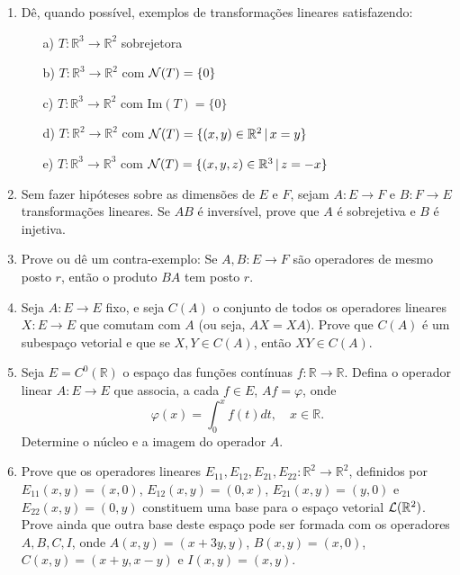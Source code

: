 \documentclass[12pt]{article}
\begin{document}
\begin{enumerate}
\item Dê, quando possível, exemplos de transformações lineares satisfazendo:
\begin{itemize}
\item[a)] $T:{\mathbb{R}}^3\to {\mathbb{R}}^2$ sobrejetora
\item[b)] $T:{\mathbb{R}}^3\to {\mathbb{R}}^2$ com ${\cal{N}}(T) = \{0\}$
\item[c)] $T:{\mathbb{R}}^3\to {\mathbb{R}}^2$ com Im$(T) = \{0\}$
\item[d)] $T:{\mathbb{R}}^2\to {\mathbb{R}}^2$ com ${\cal{N}}(T) = \{ (x,y)\in {\mathbb{R}}^2 \, | \, x=y\}$
\item[e)] $T:{\mathbb{R}}^3\to {\mathbb{R}}^3$ com ${\cal{N}}(T) = \{ (x,y,z) \in {\mathbb{R}}^3 \, | \, z=-x\}$
\end{itemize}
   
\item Sem fazer hipóteses sobre as dimensões de $E$ e $F$, sejam $A:E\rightarrow F$ e $B:F\rightarrow E$ transformações lineares. Se $AB$ é inversível, prove que $A$ é sobrejetiva e $B$ é injetiva.

\item Prove ou dê um contra-exemplo: Se $A,B:E\rightarrow F$ são operadores de mesmo posto $r$, então o produto $BA$ tem posto $r$.

\item Seja $A:E\rightarrow E$ fixo, e seja $C(A)$ o conjunto de todos os operadores lineares $X:E\rightarrow E$ que comutam com $A$ (ou seja, $AX=XA$). Prove que $C(A)$ é um subespaço vetorial e que se $X,Y\in C(A)$, então $XY \in C(A)$.

\item Seja $E=C^0({\mathbb{R}})$ o espaço das funções contínuas $f:{\mathbb{R}}\rightarrow {\mathbb{R}}$. Defina o operador linear $A:E\rightarrow E$ que associa, a cada $f\in E$, $Af=\varphi$, onde 
  $$\varphi (x) = \int_0^x f(t) dt, \quad x\in {\mathbb{R}}.$$
  Determine o núcleo e a imagem do operador $A$.

\item Prove que os operadores lineares $E_{11}, E_{12}, E_{21}, E_{22} : {\mathbb{R}}^2 \rightarrow {\mathbb{R}}^2$, definidos por $E_{11}(x,y) = (x,0)$, $E_{12}(x,y) = (0,x)$, $E_{21}(x,y) = (y,0)$ e $E_{22}(x,y) = (0,y)$ constituem uma base para o espaço vetorial ${\cal{L}}({\mathbb{R}}^2)$. Prove ainda que outra base deste espaço pode ser formada com os operadores $A, B, C, I$, onde $A(x,y) = (x+3y,y)$, $B(x,y)=(x,0)$, $C(x,y)=(x+y,x-y)$ e $I(x,y)=(x,y)$.


\end{enumerate}
\end{document}

